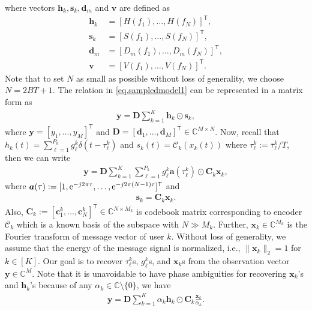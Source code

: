 \documentclass[conference,10pt]{IEEEtran}
\theoremstyle{remark}
\theoremstyle{plain}
\theoremstyle{definition}
\theoremstyle{remark}
\begin{document}
where vectors $\bm{h}_k, \bm{s}_k, \bm{d}_m$ and  $\bm{v}$ are defined as 
\begin{align*}
    \bm{h}_k & = [H(f_1),\ldots,H(f_N)]^{\mathsf{T}}, \\
     \bm{s}_k & = [S(f_1),\ldots,S(f_N)]^{\mathsf{T}}, \\ 
     \bm{d}_m & = [D_m(f_1),\ldots,D_m(f_N)]^{\mathsf{T}}, \\
     \bm{v} & =  [V(f_1),\ldots,V(f_N)]^{\mathsf{T}}.
\end{align*}
Note that to set $N$ as small as possible without loss of generality, we choose $N= 2BT + 1$.
The relation in \eqref{eq.sampledmodel1} can be represented in a matrix form as
 \begin{align}
 \bm{y}=\bm{D}\sum_{k=1}^K \bm{h}_k\odot \bm{s}_k,
 \end{align}
 where $\bm{y}=[y_{1}, \ldots,y_{M}]^{\mathsf{T}}$ and $\bm{D} = [\bm{d}_1,\ldots, \bm{d}_M]^{\mathsf{T}} \in \mathbb{C}^{M\times N}$. Now, recall that $h_k(t) = \sum_{\ell=1}^{P_k}g_{\ell}^k\delta(t-\tau_{\ell}^k)$ and $s_k(t)= \mathcal{C}_k(x_k(t))$ where ${\tau}_{\ell}^k:=  \overline{\tau}_{\ell}^k/T$, then we can write  
\begin{align}
    \label{eq.sampledmodel2}
   \bm{y} = \bm{D}\sum_{k=1}^K \sum_{\ell=1}^{P_k}g_{\ell}^k \bm{a}(\tau_{\ell}^k)\odot \bm{C}_k\bm{x}_k,
\end{align}
 where $\bm{a}(\tau):=[1,{\rm e}^{-j2\pi\tau}, \ldots ,{\rm e}^{-j2\pi(N-1)\tau}]^{\mathsf{T}}$ and 
\begin{align}\label{eq.subspace_assumption}
 \bm{s}_k=\bm{C}_k\bm{x}_k.
 \end{align} 
  Also, $\bm{C}_k:=[\bm{c}_{1}^k, \ldots, \bm{c}_{N}^k]^{\mathsf{T}}\in\mathbb{C}^{N\times M_k}$ is codebook matrix corresponding to encoder $\mathcal{C}_k$ which is a known basis of the subspace with $N\gg M_k$. Further, $\bm{x}_k\in\mathbb{C}^{M_k}$ is the Fourier transform of message vector of user $k$.  Without loss of generality, we assume that the energy of the message signal is normalized, i.e., $\|\bm{x}_k\|_2=1$ for $k \in [K]$. Our goal is to recover $\tau_{\ell}^k$s, $g_{\ell}^k$s, and $\bm{x}_k$s from the observation vector $\bm{y}\in\mathbb{C}^{M}$. Note that it is unavoidable to
have phase ambiguities for recovering $\bm{x}_k$'s and $\bm{h}_k$'s because of any $\alpha_k\in\mathbb{C}\setminus\{0\}$, we have
 \begin{align}
 \bm{y}= \bm{D}\sum_{k=1}^K\alpha_k\bm{h}_k\odot \bm{C}_k\frac{\bm{x}_k}{\alpha_k}.
 \end{align}
\end{document}
